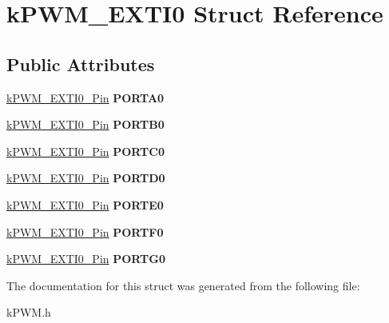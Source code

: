\hypertarget{structkPWM__EXTI0}{}\section{k\+P\+W\+M\+\_\+\+E\+X\+T\+I0 Struct Reference}
\label{structkPWM__EXTI0}
\subsection*{Public Attributes}
\begin{DoxyCompactItemize}
\item 
\hyperlink{structkPWM__EXTI0__Pin}{k\+P\+W\+M\+\_\+\+E\+X\+T\+I0\+\_\+\+Pin} {\bfseries P\+O\+R\+T\+A0}\hypertarget{structkPWM__EXTI0_aa3a71d7f86dcf8a31fc502f18dc69fba}{}\label{structkPWM__EXTI0_aa3a71d7f86dcf8a31fc502f18dc69fba}

\item 
\hyperlink{structkPWM__EXTI0__Pin}{k\+P\+W\+M\+\_\+\+E\+X\+T\+I0\+\_\+\+Pin} {\bfseries P\+O\+R\+T\+B0}\hypertarget{structkPWM__EXTI0_aae513308957ac9d22ad880bad1dcdbe9}{}\label{structkPWM__EXTI0_aae513308957ac9d22ad880bad1dcdbe9}

\item 
\hyperlink{structkPWM__EXTI0__Pin}{k\+P\+W\+M\+\_\+\+E\+X\+T\+I0\+\_\+\+Pin} {\bfseries P\+O\+R\+T\+C0}\hypertarget{structkPWM__EXTI0_abf17bd93d09e5714d48e5762ef9b8d29}{}\label{structkPWM__EXTI0_abf17bd93d09e5714d48e5762ef9b8d29}

\item 
\hyperlink{structkPWM__EXTI0__Pin}{k\+P\+W\+M\+\_\+\+E\+X\+T\+I0\+\_\+\+Pin} {\bfseries P\+O\+R\+T\+D0}\hypertarget{structkPWM__EXTI0_a04eb86653c56e96aed7f69eda82ee72f}{}\label{structkPWM__EXTI0_a04eb86653c56e96aed7f69eda82ee72f}

\item 
\hyperlink{structkPWM__EXTI0__Pin}{k\+P\+W\+M\+\_\+\+E\+X\+T\+I0\+\_\+\+Pin} {\bfseries P\+O\+R\+T\+E0}\hypertarget{structkPWM__EXTI0_a5be32c8556f6de08ea9a1632d532e351}{}\label{structkPWM__EXTI0_a5be32c8556f6de08ea9a1632d532e351}

\item 
\hyperlink{structkPWM__EXTI0__Pin}{k\+P\+W\+M\+\_\+\+E\+X\+T\+I0\+\_\+\+Pin} {\bfseries P\+O\+R\+T\+F0}\hypertarget{structkPWM__EXTI0_a96672e3dad411bd52096e3f422b5405b}{}\label{structkPWM__EXTI0_a96672e3dad411bd52096e3f422b5405b}

\item 
\hyperlink{structkPWM__EXTI0__Pin}{k\+P\+W\+M\+\_\+\+E\+X\+T\+I0\+\_\+\+Pin} {\bfseries P\+O\+R\+T\+G0}\hypertarget{structkPWM__EXTI0_afaefd63c2035af4e6e7db55fc9daf331}{}\label{structkPWM__EXTI0_afaefd63c2035af4e6e7db55fc9daf331}

\end{DoxyCompactItemize}


The documentation for this struct was generated from the following file\+:\begin{DoxyCompactItemize}
\item 
k\+P\+W\+M.\+h\end{DoxyCompactItemize}
